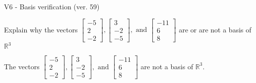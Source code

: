 \begin{exercise}
  \begin{exerciseTitle}V6 - Basis verification (ver. 59)\end{exerciseTitle}
  \begin{exerciseStatement}
    Explain why the vectors \(\left[\begin{array}{r}
-5 \\
2 \\
-2
\end{array}\right] , \left[\begin{array}{r}
3 \\
-2 \\
-5
\end{array}\right] , \text{ and } \left[\begin{array}{r}
-11 \\
6 \\
8
\end{array}\right]\) are or are not a basis of \(\mathbb{R}^3\)	


  \end{exerciseStatement}
  \begin{exerciseAnswer}
   The vectors \(\left[\begin{array}{r}
-5 \\
2 \\
-2
\end{array}\right] , \left[\begin{array}{r}
3 \\
-2 \\
-5
\end{array}\right] , \text{ and } \left[\begin{array}{r}
-11 \\
6 \\
8
\end{array}\right]\) 
  	 are not  a basis of \(\mathbb{R}^3\).
  


  \end{exerciseAnswer}
\end{exercise}